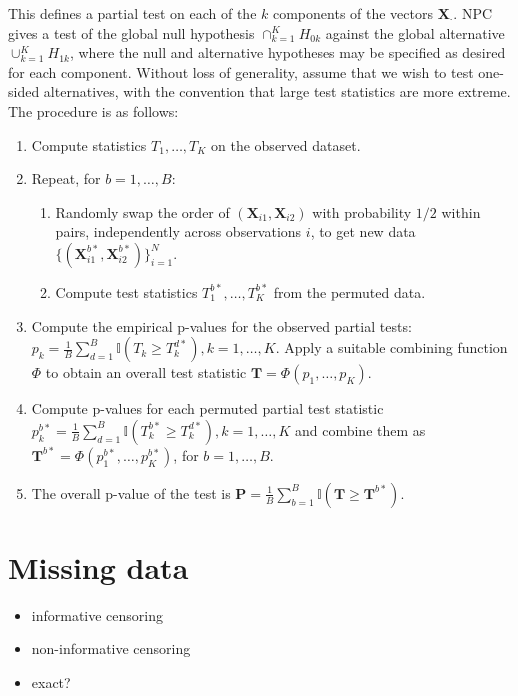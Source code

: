 \documentclass[12pt]{article}
\newcommand{\ind}{\mathbb{I}} %
\begin{document}
This defines a partial test on each of the $k$ components of the vectors $\mathbf{X}_{\cdot}$.
NPC gives a test of the global null hypothesis $\cap_{k=1}^K H_{0k}$ against the global alternative $\cup_{k=1}^K H_{1k}$,
where the null and alternative hypotheses may be specified as desired for each component.
Without loss of generality, assume that we wish to test one-sided alternatives, with the convention that large test statistics are more extreme.
The procedure is as follows:
\begin{enumerate}
\item Compute statistics $T_1, \dots, T_K$ on the observed dataset.
\item Repeat, for $b = 1, \dots, B$:
\begin{enumerate}
\item Randomly swap the order of $(\mathbf{X}_{i1}, \mathbf{X}_{i2})$ with probability $1/2$ within pairs, independently across observations $i$, 
to get new data $\{ (\mathbf{X}_{i1}^{b*}, \mathbf{X}_{i2}^{b*}) \}_{i=1}^N$.
\item Compute test statistics $T_1^{b*}, \dots, T_K^{b*}$ from the permuted data.
\end{enumerate}
\item Compute the empirical p-values for the observed partial tests: $p_k = \frac{1}{B}\sum_{d=1}^B \ind{(T_k \geq T_k^{d*})}, k = 1, \dots, K$.
Apply a suitable combining function $\Phi$ to obtain an overall test statistic $\mathbf{T} = \Phi(p_1, \dots, p_K)$.
\item Compute p-values for each permuted partial test statistic $p_{k}^{b*} = \frac{1}{B}\sum_{d=1}^B \ind{(T_k^{b*} \geq T_k^{d*})}, k = 1, \dots, K$ and combine them as $\mathbf{T}^{b*} = \Phi(p_1^{b*}, \dots, p_K^{b*})$, for $b = 1, \dots, B$.
\item The overall p-value of the test is $\mathbf{P} = \frac{1}{B} \sum_{b=1}^B \ind{(\mathbf{T} \geq \mathbf{T}^{b*})}$.
\end{enumerate}




\section{Missing data}
\begin{itemize}
\item informative censoring
\item non-informative censoring
\item exact?
\end{itemize}

%
%
\end{document}
